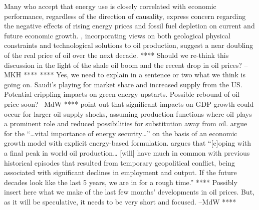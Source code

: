 \documentclass[preprint,authoryear,12pt]{elsarticle}\usepackage[]{graphicx}\usepackage[]{color}
\begin{document}
Many who accept that energy use is closely correlated with
economic performance, regardless of the direction of causality,
express concern regarding the negative effects of 
rising energy prices and fossil fuel depletion 
on current and future economic growth.
\citet{Benes:2012tm}, incorporating views on both
geological physical constraints and 
technological solutions to oil production, 
suggest a near doubling of the real price of oil over the next decade.  
**** Should we re-think this discussion in the light of the shale oil boom and the 
recent drop in oil prices? --MKH ****
**** Yes, we need to explain in a sentence or two what we think is going on. 
Saudi's playing for market share and increased supply 
from the US. 
Potential crippling impacts on green energy upstarts. 
Possible rebound of oil price soon? --MdW ****
\citet{Kumhof:2012ua} point out that 
significant impacts on GDP growth could occur
for larger oil supply shocks, 
assuming production functions where oil plays a prominent role 
and reduced possibilities for substitution away from oil.  
\citet{Nel:2010fv} argue for the 
``\dots{}vital importance of energy security\dots'' 
on the basis of an economic growth model with explicit 
energy-based formulation.  
\citet{Hamilton:2013vc} argues that 
``[c]oping with a final peak in world oil production\dots%
[will] have much in common with previous historical episodes that resulted from 
temporary geopolitical conflict, 
being associated with significant declines in employment and output. 
If the future decades look like the last 5 years, we are in for a rough time.'' 
**** Possibly insert here what we make of the last few months' 
developments in oil prices. 
But, as it will be speculative, it needs to be very short and focused. --MdW ****
\end{document}
